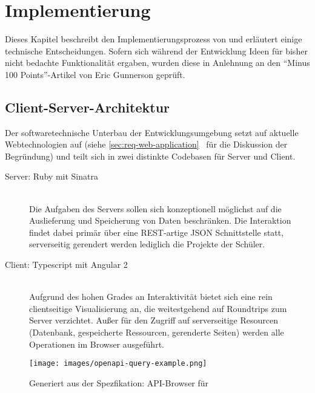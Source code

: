 \section{Implementierung}
\label{sec:implementation-analysis}

Dieses Kapitel beschreibt den Implementierungsprozess von \idename und erläutert einige technische Entscheidungen. Sofern sich während der Entwicklung Ideen für bisher nicht bedachte Funktionalität ergaben, wurden diese in Anlehnung an den "`Minus 100 Points"'-Artikel von Eric Gunnerson \cite{gunnerson-minus-100} geprüft.


\subsection{Client-Server-Architektur}

Der softwaretechnische Unterbau der Entwicklungsumgebung setzt auf aktuelle Webtechnologien auf (siehe \ref{sec:req-web-application}~ für die Diskussion der Begründung) und teilt sich in zwei distinkte Codebasen für Server und Client.

\begin{description}
\item[Server: Ruby mit Sinatra] \hfill\\
  Die Aufgaben des Servers sollen sich konzeptionell möglichst auf die Auslieferung und Speicherung von Daten beschränken. Die Interaktion findet dabei primär über eine REST-artige JSON Schnittstelle statt, serverseitig gerendert werden lediglich die Projekte der Schüler.
\item[Client: Typescript mit Angular 2] \hfill\\
  Aufgrund des hohen Grades an Interaktivität bietet sich eine rein clientseitige Visualisierung an, die weitestgehend auf Roundtrips zum Server verzichtet. Außer für den Zugriff auf serverseitige Resourcen (Datenbank, gespeicherte Ressourcen, gerenderte Seiten) werden alle Operationen im Browser ausgeführt.
\end{description}

\begin{figure}[p]
  \centering \texttt{[image: images/openapi-query-example.png]}
  \caption{Generiert aus der Spezfikation: API-Browser für \idename}
  \label{fig:openapi-query-example}
\end{figure}

